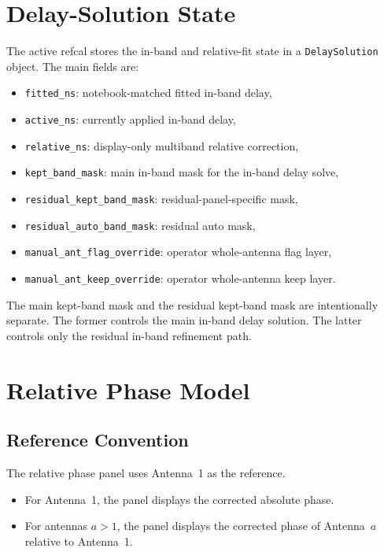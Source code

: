 \documentclass[11pt]{article}
\begin{document}
\section{Delay-Solution State}

The active refcal stores the in-band and relative-fit state in a
\texttt{DelaySolution} object. The main fields are:
\begin{itemize}[leftmargin=1.5em]
  \item \texttt{fitted\_ns}: notebook-matched fitted in-band delay,
  \item \texttt{active\_ns}: currently applied in-band delay,
  \item \texttt{relative\_ns}: display-only multiband relative correction,
  \item \texttt{kept\_band\_mask}: main in-band mask for the in-band delay solve,
  \item \texttt{residual\_kept\_band\_mask}: residual-panel-specific mask,
  \item \texttt{residual\_auto\_band\_mask}: residual auto mask,
  \item \texttt{manual\_ant\_flag\_override}: operator whole-antenna flag layer,
  \item \texttt{manual\_ant\_keep\_override}: operator whole-antenna keep layer.
\end{itemize}

The main kept-band mask and the residual kept-band mask are intentionally
separate. The former controls the main in-band delay solution. The latter
controls only the residual in-band refinement path.

\section{Relative Phase Model}

\subsection{Reference Convention}

The relative phase panel uses Antenna~1 as the reference.
\begin{itemize}[leftmargin=1.5em]
  \item For Antenna~1, the panel displays the corrected absolute phase.
  \item For antennas $a>1$, the panel displays the corrected phase of
  Antenna~$a$ relative to Antenna~1.
\end{itemize}
\end{document}
